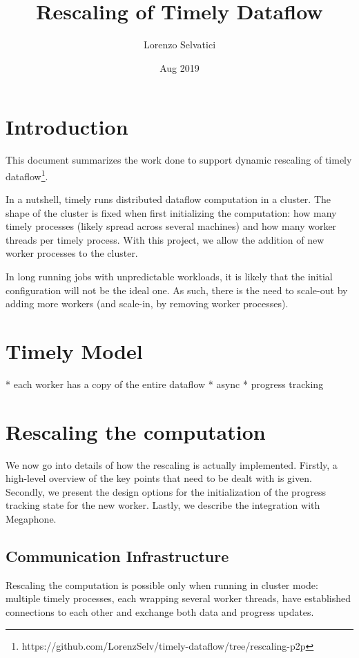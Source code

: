 \documentclass[12pt]{extarticle}
\title{Rescaling of Timely Dataflow}
\author{Lorenzo Selvatici}
\date{Aug 2019}
\begin{document}
\maketitle

\section{Introduction}

This document summarizes the work done to support dynamic rescaling of timely dataflow\footnote{https://github.com/LorenzSelv/timely-dataflow/tree/rescaling-p2p}.

In a nutshell, timely runs distributed dataflow computation in a cluster. The shape of the cluster is fixed
when first initializing the computation: how many timely processes (likely spread across several machines) and how many worker threads per timely process.
With this project, we allow the addition of new worker processes to the cluster.

In long running jobs with unpredictable workloads, it is likely that the initial configuration will not be the ideal one.
As such, there is the need to scale-out by adding more workers (and scale-in, by removing worker processes).

\section{Timely Model}

* each worker has a copy of the entire dataflow
* async
* progress tracking

\section{Rescaling the computation}

We now go into details of how the rescaling is actually implemented.
Firstly, a high-level overview of the key points that need to be dealt with is given.
Secondly, we present the design options for the initialization of the progress tracking state for the new worker.
Lastly, we describe the integration with Megaphone.

\subsection{Communication Infrastructure}

Rescaling the computation is possible only when running in cluster mode: multiple timely processes, each wrapping several worker
threads, have established connections to each other and exchange both data and progress updates.
\end{document}
